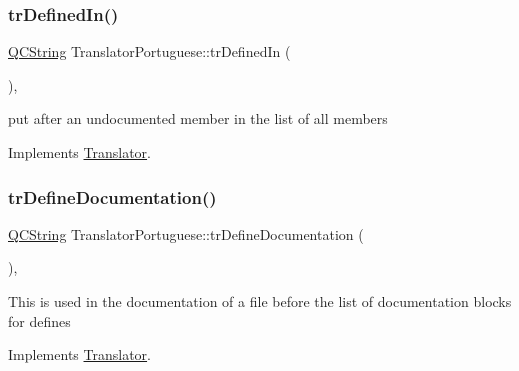\mbox{\label{class_translator_portuguese_a4b6b01518bccb0fd6b84d03725a4d03f}} 
\subsubsection{\texorpdfstring{trDefinedIn()}{trDefinedIn()}}
{\footnotesize\ttfamily \mbox{\hyperlink{class_q_c_string}{Q\+C\+String}} Translator\+Portuguese\+::tr\+Defined\+In (\begin{DoxyParamCaption}{ }\end{DoxyParamCaption})\hspace{0.3cm}{\ttfamily [inline]}, {\ttfamily [virtual]}}

put after an undocumented member in the list of all members 

Implements \mbox{\hyperlink{class_translator}{Translator}}.

\mbox{\label{class_translator_portuguese_a08b6adb52f21b563a4f6521fd6f32fd6}} 
\subsubsection{\texorpdfstring{trDefineDocumentation()}{trDefineDocumentation()}}
{\footnotesize\ttfamily \mbox{\hyperlink{class_q_c_string}{Q\+C\+String}} Translator\+Portuguese\+::tr\+Define\+Documentation (\begin{DoxyParamCaption}{ }\end{DoxyParamCaption})\hspace{0.3cm}{\ttfamily [inline]}, {\ttfamily [virtual]}}

This is used in the documentation of a file before the list of documentation blocks for defines 

Implements \mbox{\hyperlink{class_translator}{Translator}}.

\mbox{\label{class_translator_portuguese_af2519296f0977966fc38817b889cdc3c}} 
